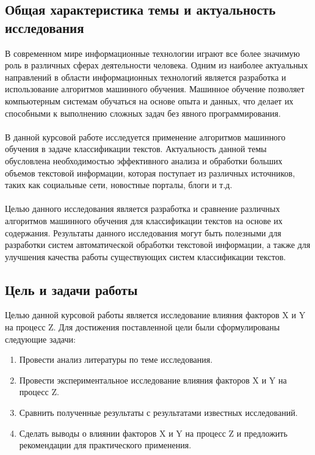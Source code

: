 \documentclass{article}
\begin{document}
\subsection{Общая характеристика темы и актуальность исследования}
В современном мире информационные технологии играют все более значимую роль в различных сферах деятельности человека. Одним из наиболее актуальных направлений в области информационных технологий является разработка и использование алгоритмов машинного обучения. Машинное обучение позволяет компьютерным системам обучаться на основе опыта и данных, что делает их способными к выполнению сложных задач без явного программирования.\\
~\\
В данной курсовой работе исследуется применение алгоритмов машинного обучения в задаче классификации текстов. Актуальность данной темы обусловлена необходимостью эффективного анализа и обработки больших объемов текстовой информации, которая поступает из различных источников, таких как социальные сети, новостные порталы, блоги и т.д.\\
~\\
Целью данного исследования является разработка и сравнение различных алгоритмов машинного обучения для классификации текстов на основе их содержания. Результаты данного исследования могут быть полезными для разработки систем автоматической обработки текстовой информации, а также для улучшения качества работы существующих систем классификации текстов.
\subsection{Цель и задачи работы}
Целью данной курсовой работы является исследование влияния факторов X и Y на процесс Z. Для достижения поставленной цели были сформулированы следующие задачи:
\begin{enumerate}
\item Провести анализ литературы по теме исследования.
\item Провести экспериментальное исследование влияния факторов X и Y на процесс Z.
\item Сравнить полученные результаты с результатами известных исследований.
\item Сделать выводы о влиянии факторов X и Y на процесс Z и предложить рекомендации для практического применения.
\end{enumerate}
\end{document}
